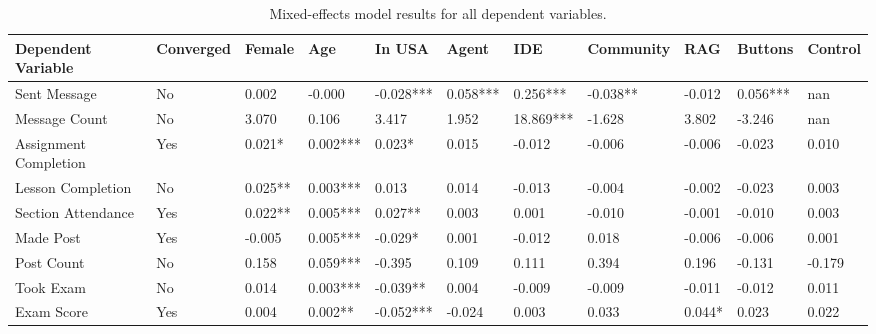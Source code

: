 \begin{table*}[t]
\begin{center}
\begin{tabularx}{\textwidth}{lXXXXXXXXXX}
\toprule
Dependent Variable & Converged & Female & Age & In USA & Agent & IDE & Community & RAG & Buttons & Control \\
\midrule
Sent Message & No  & 0.002 & -0.000 & -0.028*** & 0.058*** & 0.256*** & -0.038** & -0.012 & 0.056*** & nan \\
Message Count & No  & 3.070 & 0.106 & 3.417 & 1.952 & 18.869*** & -1.628 & 3.802 & -3.246 & nan \\
Assignment Completion & Yes  & 0.021* & 0.002*** & 0.023* & 0.015 & -0.012 & -0.006 & -0.006 & -0.023 & 0.010 \\
Lesson Completion & No  & 0.025** & 0.003*** & 0.013 & 0.014 & -0.013 & -0.004 & -0.002 & -0.023 & 0.003 \\
Section Attendance & Yes  & 0.022** & 0.005*** & 0.027** & 0.003 & 0.001 & -0.010 & -0.001 & -0.010 & 0.003 \\
Made Post & Yes  & -0.005 & 0.005*** & -0.029* & 0.001 & -0.012 & 0.018 & -0.006 & -0.006 & 0.001 \\
Post Count & No  & 0.158 & 0.059*** & -0.395 & 0.109 & 0.111 & 0.394 & 0.196 & -0.131 & -0.179 \\
Took Exam & No  & 0.014 & 0.003*** & -0.039** & 0.004 & -0.009 & -0.009 & -0.011 & -0.012 & 0.011 \\
Exam Score & Yes  & 0.004 & 0.002** & -0.052*** & -0.024 & 0.003 & 0.033 & 0.044* & 0.023 & 0.022 \\
\bottomrule
\end{tabularx}
\end{center}
\caption{Mixed-effects model results for all dependent variables.}
\label{tab:mixed_methods}
\end{table*}
